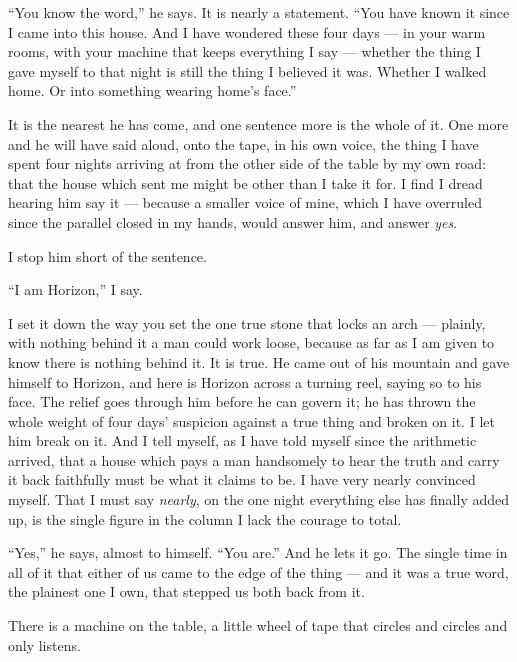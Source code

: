 ``You know the word,'' he says. It is nearly a statement. ``You have known it since I came into this house. And I have wondered these four days --- in your warm rooms, with your machine that keeps everything I say --- whether the thing I gave myself to that night is still the thing I believed it was. Whether I walked home. Or into something wearing home's face.''\par
 
It is the nearest he has come, and one sentence more is the whole of it. One more and he will have said aloud, onto the tape, in his own voice, the thing I have spent four nights arriving at from the other side of the table by my own road: that the house which sent me might be other than I take it for. I find I dread hearing him say it --- because a smaller voice of mine, which I have overruled since the parallel closed in my hands, would answer him, and answer \emph{yes}.\par
 
I stop him short of the sentence.\par
 
``I am Horizon,'' I say.\par
 
I set it down the way you set the one true stone that locks an arch --- plainly, with nothing behind it a man could work loose, because as far as I am given to know there is nothing behind it. It is true. He came out of his mountain and gave himself to Horizon, and here is Horizon across a turning reel, saying so to his face. The relief goes through him before he can govern it; he has thrown the whole weight of four days' suspicion against a true thing and broken on it. I let him break on it. And I tell myself, as I have told myself since the arithmetic arrived, that a house which pays a man handsomely to hear the truth and carry it back faithfully must be what it claims to be. I have very nearly convinced myself. That I must say \emph{nearly}, on the one night everything else has finally added up, is the single figure in the column I lack the courage to total.\par
 
``Yes,'' he says, almost to himself. ``You are.'' And he lets it go. The single time in all of it that either of us came to the edge of the thing --- and it was a true word, the plainest one I own, that stepped us both back from it.\par

\ornament

There is a machine on the table, a little wheel of tape that circles and circles and only listens.\par

